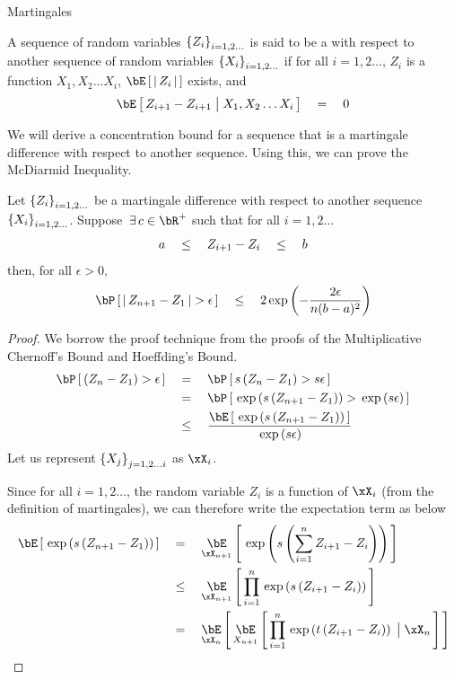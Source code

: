 \documentclass[11pt,a4paper]{article}
\begin{document}
\begin{ssection}{Martingales}
	\begin{definition}
		A sequence of random variables $\left\{ {Z_i} \right\}_{i = 1, 2 \dots}$ is said to be a  with respect to another sequence of random variables $\left\{ {X_i} \right\}_{i = 1, 2 \dots}$ if for all $i = 1, 2 \dots$, $Z_i$ is a function $X_1, X_2 \dots X_i$, $\E{\abs{Z_i}}$ exists, and
		\begin{align*}
			\E{Z_{i + 1} - Z_{i + 1} \pipe X_1, X_2 \dots X_i}	\eq	0 
		\end{align*}
		\label{def:maringale-difference}
	\end{definition}
	
	We will derive a concentration bound for a sequence that is a martingale difference with respect to another sequence. Using this, we can prove the McDiarmid Inequality. \br
	
	\begin{theorem}
		Let $\left\{ {Z_i} \right\}_{i = 1, 2 \dots}$ be a martingale difference with respect to another sequence $\left\{ {X_i} \right\}_{i = 1, 2 \dots}$. Suppose $\qexists c \in \bR^+$ such that for all $i = 1, 2 \dots$
		\begin{align*}
			a	\quad \le \quad	Z_{i + 1} - Z_i	\quad \le \quad	b 
		\end{align*}
		then, for all $\epsilon > 0$,
		\begin{equation}
			\prob{\abs{Z_{n + 1} - Z_1} > \epsilon}	\qle	2 \texp{-\frac{2\epsilon}{n(b - a)^2}}
			\label{eq:azuma}
		\end{equation}
		\label{th:azuma}
	\end{theorem}
	
	\begin{proof}
		We borrow the proof technique from the proofs of the Multiplicative Chernoff's Bound and Hoeffding's Bound.
		\begin{align*}
			\prob{\para{Z_n - Z_1} > \epsilon} & \eq	\prob{s \para{Z_n - Z_1} > s \epsilon}                         \\
			                                   & \eq	\prob{\texp{s \para{Z_{n + 1} - Z_1}} > \texp{s \epsilon}}     \\
			                                   & \qle	\frac{\E{\texp{s \para{Z_{n + 1} - Z_1}}}}{\texp{s \epsilon}} 
		\end{align*}
		Let us represent $\left\{ {X_j} \right\}_{j = 1, 2 \dots i}$ as $\xX_i$.
		
		Since for all $i = 1, 2 \dots$, the random variable $Z_i$ is a function of $\xX_i$ (from the definition of martingales), we can therefore write the expectation term as below
		\begin{align*}
			\E{\texp{s \para{Z_{n + 1} - Z_1}}} & \eq	\E[\xX_{n + 1}]{\texp{s \para{\sum_{i = 1}^n Z_{i + 1} - Z_i}}}                       \\
			                                    & \qle	\E[\xX_{n + 1}]{\prod_{i = 1}^n \texp{s \para{Z_{i + 1} - Z_i}}}                     \\
			                                    & \eq	\E[\xX_n]{\E[X_{n + 1}]{\prod_{i = 1}^n \texp{t \para{Z_{i + 1} - Z_i}} \pipe \xX_n}} 
		\end{align*}
		

\end{proof}
\end{ssection}
\end{document}
